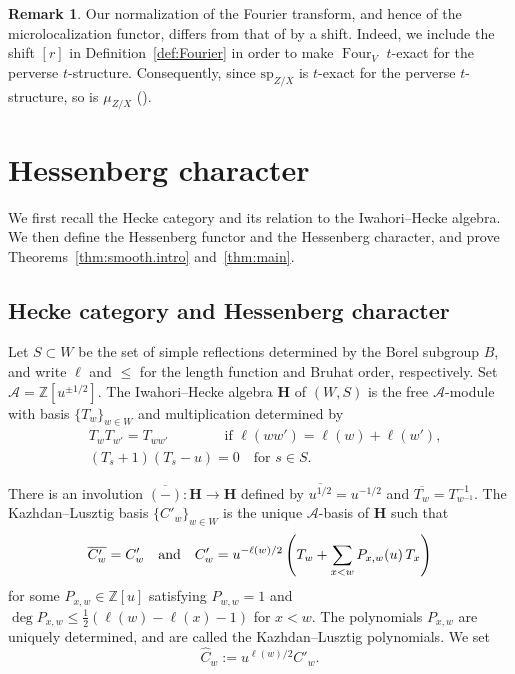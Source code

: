 \documentclass[11pt]{amsart}
\numberwithin{equation}{section}
\theoremstyle{definition}
\newtheorem{remark}[theorem]{Remark}
\newcommand\hecke{\mathbf{H}}  %
\def\and{\quad{\rm and}\quad}
\def\sp{\mathrm{sp}}
\DeclareMathOperator{\Four}{Four}
\def\cA{\mathcal {A}}
\begin{document}
\begin{remark}\label{rem:mu.texact}
	Our normalization of the Fourier %
	transform, and hence of the microlocalization functor, differs from that of \cite{KS94} by a shift. 
	Indeed, we include the shift $[r]$ in Definition~\ref{def:Fourier} in order to %
	make $\Four_V$ $t$-exact for the perverse $t$-structure.
	Consequently, since $\sp_{Z/X}$ is $t$-exact for the perverse $t$-structure, so is $\mu_{Z/X}$ (\cite[Proposition~10.3.19]{KS94}).
\end{remark}


\section{Hessenberg character}\label{s:hess}
We first recall the Hecke category and its relation to the Iwahori--Hecke algebra.
We then define the Hessenberg functor and the Hessenberg character, and prove Theorems~\ref{thm:smooth.intro} and~\ref{thm:main}.

\subsection{Hecke category and Hessenberg character}
\label{ss Hecke}
Let $S\subset W$ be the set of simple reflections determined by the Borel subgroup $B$, and write $\ell$ and $\leq$ for the length function and Bruhat order, respectively.
Set $\cA=\mathbb Z[u^{\pm1/2}]$.
The Iwahori--Hecke algebra $\hecke$ of $(W,S)$ is the free $\cA$-module with basis $\{T_w\}_{w\in W}$ and multiplication determined by
\begin{align*}
  &T_w T_{w'} = T_{ww'} \qquad\qquad  \text{if } \ell(ww')=\ell(w)+\ell(w'), \\
  &(T_s+1)(T_s-u)=0 \quad \text{for } s\in S.
\end{align*}

There is an involution $\overline{(-)}:\hecke\to\hecke$ defined by
$\overline{u^{1/2}}=u^{-1/2}$ and $\overline{T_w}=T_{w^{-1}}^{-1}$.
The Kazhdan--Lusztig basis $\{C'_w\}_{w\in W}$ is the unique $\cA$-basis of $\hecke$ such that
\[\overline{C'_w}=C'_w \and C'_w = u^{-\ell(w)/2}\left(T_w + \sum_{x< w} P_{x,w}(u)\,T_x\right)\]
for some $P_{x,w}\in\mathbb{Z}[u]$ satisfying $P_{w,w}=1$ and $\deg P_{x,w}\le \frac{1}{2}(\ell(w)-\ell(x)-1)$ for $x<w$.
The polynomials $P_{x,w}$ are uniquely determined, and are called the Kazhdan--Lusztig polynomials.
We set
\[\widehat C_w := u^{\ell(w)/2} C'_w.\]
\end{document}
